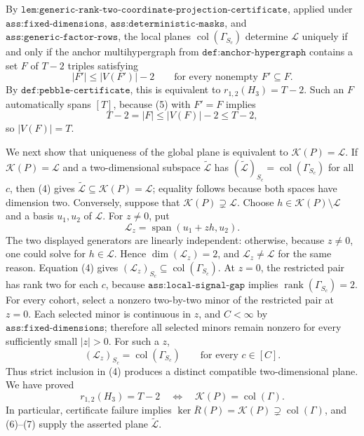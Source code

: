 By \(\texttt{lem:generic-rank-two-coordinate-projection-certificate}\), applied under \(\texttt{ass:fixed-dimensions}\), \(\texttt{ass:deterministic-masks}\), and \(\texttt{ass:generic-factor-rows}\), the local planes \(\operatorname{col}(\Gamma_{S_c})\) determine \(\mathcal L\) uniquely if and only if the anchor multihypergraph from \(\texttt{def:anchor-hypergraph}\) contains a set \(F\) of \(T-2\) triples satisfying
\[
|F'|\leq |V(F')|-2
\qquad\text{for every nonempty }F'\subseteq F.
\tag{5}
\]
By \(\texttt{def:pebble-certificate}\), this is equivalent to \(r_{1,2}(H_3)=T-2\). Such an \(F\) automatically spans \([T]\), because (5) with \(F'=F\) implies
\[
T-2=|F|\leq |V(F)|-2\leq T-2,
\]
so \(|V(F)|=T\).

We next show that uniqueness of the global plane is equivalent to \(\mathcal K(P)=\mathcal L\). If \(\mathcal K(P)=\mathcal L\) and a two-dimensional subspace \(\widetilde{\mathcal L}\) has \((\widetilde{\mathcal L})_{S_c}=\operatorname{col}(\Gamma_{S_c})\) for all \(c\), then (4) gives \(\widetilde{\mathcal L}\subseteq\mathcal K(P)=\mathcal L\); equality follows because both spaces have dimension two. Conversely, suppose that \(\mathcal K(P)\supsetneq\mathcal L\). Choose \(h\in\mathcal K(P)\setminus\mathcal L\) and a basis \(u_1,u_2\) of \(\mathcal L\). For \(z\neq0\), put
\[
\mathcal L_z=\operatorname{span}(u_1+zh,u_2).
\tag{6}
\]
The two displayed generators are linearly independent: otherwise, because \(z\neq0\), one could solve for \(h\in\mathcal L\). Hence \(\dim(\mathcal L_z)=2\), and \(\mathcal L_z\neq\mathcal L\) for the same reason. Equation (4) gives \((\mathcal L_z)_{S_c}\subseteq\operatorname{col}(\Gamma_{S_c})\). At \(z=0\), the restricted pair has rank two for each \(c\), because \(\texttt{ass:local-signal-gap}\) implies \(\operatorname{rank}(\Gamma_{S_c})=2\). For every cohort, select a nonzero two-by-two minor of the restricted pair at \(z=0\). Each selected minor is continuous in \(z\), and \(C<\infty\) by \(\texttt{ass:fixed-dimensions}\); therefore all selected minors remain nonzero for every sufficiently small \(|z|>0\). For such a \(z\),
\[
(\mathcal L_z)_{S_c}=\operatorname{col}(\Gamma_{S_c})
\qquad\text{for every }c\in[C].
\tag{7}
\]
Thus strict inclusion in (4) produces a distinct compatible two-dimensional plane. We have proved
\[
r_{1,2}(H_3)=T-2
\quad\Longleftrightarrow\quad
\mathcal K(P)=\operatorname{col}(\Gamma).
\tag{8}
\]
In particular, certificate failure implies \(\ker\overline R(P)=\mathcal K(P)\supsetneq\operatorname{col}(\Gamma)\), and (6)--(7) supply the asserted plane \(\widetilde{\mathcal L}\).

